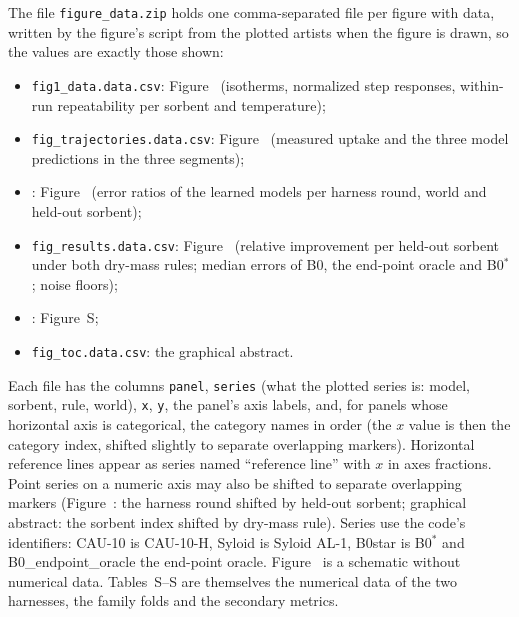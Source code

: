 \documentclass[11pt]{article}
\begin{document}
The file \texttt{figure\_data.zip} holds one comma-separated file per figure with data, written by the figure's script
from the plotted artists when the figure is drawn, so the values are exactly those shown:
\begin{itemize}
\item \texttt{fig1\_data.data.csv}: Figure~ (isotherms, normalized step responses, within-run repeatability per sorbent and
  temperature);
\item \texttt{fig\_trajectories.data.csv}: Figure~ (measured uptake and the three model predictions in the three
  segments);
\item \texttt{}: Figure~ (error ratios of the learned models per harness round, world and
  held-out sorbent);
\item \texttt{fig\_results.data.csv}: Figure~ (relative improvement per held-out sorbent under both dry-mass
  rules; median errors of B0, the end-point oracle and B0$^{*}$; noise floors);
\item \texttt{}: Figure~S;
\item \texttt{fig\_toc.data.csv}: the graphical abstract.
\end{itemize}
Each file has the columns \texttt{panel}, \texttt{series} (what the plotted series is: model, sorbent, rule, world),
\texttt{x}, \texttt{y}, the panel's axis labels, and, for panels whose horizontal axis is categorical, the category
names in order (the $x$ value is then the category index, shifted slightly to separate overlapping markers).
Horizontal reference lines appear as series named ``reference line'' with $x$ in axes fractions. Point series on a numeric axis may also be shifted to separate overlapping markers (Figure~: the harness round shifted by held-out sorbent; graphical abstract: the sorbent index shifted by dry-mass rule). Series use the code's identifiers: CAU-10 is CAU-10-H, Syloid is Syloid AL-1, B0star is B0$^{*}$ and B0\_endpoint\_oracle the end-point oracle. Figure~ is a
schematic without numerical data. Tables~S--S are themselves the numerical data of the two harnesses, the family
folds and the secondary metrics.

{\raggedright}
\end{document}
